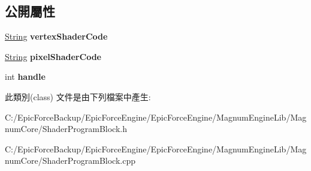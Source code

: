 \subsection*{公開屬性}
\begin{DoxyCompactItemize}
\item 
\hyperlink{class_magnum_1_1_string}{String} {\bfseries vertex\+Shader\+Code}\hypertarget{class_magnum_1_1_shader_program_block_a36a09be44785c2056b2b96da17ff0ebf}{}\label{class_magnum_1_1_shader_program_block_a36a09be44785c2056b2b96da17ff0ebf}

\item 
\hyperlink{class_magnum_1_1_string}{String} {\bfseries pixel\+Shader\+Code}\hypertarget{class_magnum_1_1_shader_program_block_ae89abff4c65f0b98f675bfa82fc034e1}{}\label{class_magnum_1_1_shader_program_block_ae89abff4c65f0b98f675bfa82fc034e1}

\item 
int {\bfseries handle}\hypertarget{class_magnum_1_1_shader_program_block_aa5ac818940b7beddc68b08a702f794a0}{}\label{class_magnum_1_1_shader_program_block_aa5ac818940b7beddc68b08a702f794a0}

\end{DoxyCompactItemize}


此類別(class) 文件是由下列檔案中產生\+:\begin{DoxyCompactItemize}
\item 
C\+:/\+Epic\+Force\+Backup/\+Epic\+Force\+Engine/\+Epic\+Force\+Engine/\+Magnum\+Engine\+Lib/\+Magnum\+Core/Shader\+Program\+Block.\+h\item 
C\+:/\+Epic\+Force\+Backup/\+Epic\+Force\+Engine/\+Epic\+Force\+Engine/\+Magnum\+Engine\+Lib/\+Magnum\+Core/Shader\+Program\+Block.\+cpp\end{DoxyCompactItemize}
